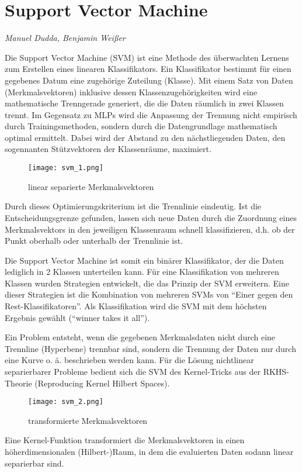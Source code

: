 \section{Support Vector Machine}
\textit{Manuel Dudda, Benjamin Weißer}

Die Support Vector Machine (SVM) ist eine Methode des überwachten Lernens zum Erstellen eines linearen Klassifikators. Ein Klassifikator bestimmt für einen gegebenes Datum eine zugehörige Zuteilung (Klasse). Mit einem Satz von Daten (Merkmalsvektoren) inklusive dessen Klassenzugehörigkeiten wird eine mathematische Trenngerade generiert, die die Daten räumlich in zwei Klassen trennt. Im Gegensatz zu MLPs wird die Anpassung der Trennung nicht empirisch durch Trainingsmethoden, sondern durch die Datengrundlage mathematisch optimal ermittelt. Dabei wird der Abstand zu den nächstliegenden Daten, den sogennanten Stützvektoren der Klassenräume, maximiert.

\begin{wrapfigure}{r}{0.4\textwidth}
	\vspace{-30pt}
	\begin{center}
		 \texttt{[image: svm\_1.png]}
	\end{center}
	\vspace{-15pt}
	\caption{linear separierte Merkmalsvektoren}
	\vspace{-15pt}
\end{wrapfigure}

Durch dieses Optimierungskriterium ist die Trennlinie eindeutig. Ist die Entscheidungsgrenze gefunden, lassen sich neue Daten durch die Zuordnung eines Merkmalsvektors in den jeweiligen Klassenraum schnell klassifizieren, d.h. ob der Punkt oberhalb oder unterhalb der Trennlinie ist.

Die Support Vector Machine ist somit ein binärer Klassifikator, der die Daten lediglich in 2 Klassen unterteilen kann. Für eine Klassifikation von mehreren Klassen wurden Strategien entwickelt, die das Prinzip der SVM erweitern. Eine dieser Strategien ist die Kombination von mehreren SVMs von “Einer gegen den Rest-Klassifikatoren”. Als Klassifikation wird die SVM mit dem höchsten Ergebnis gewählt (“winner takes it all”).

Ein Problem entsteht, wenn die gegebenen Merkmalsdaten nicht durch eine Trennline (Hyperbene) trennbar sind, sondern die Trennung der Daten nur durch eine Kurve o. ä. beschrieben werden kann. Für die Lösung nichtlinear separierbarer Probleme bedient sich die SVM des Kernel-Tricks aus der RKHS-Theorie (Reproducing Kernel Hilbert Spaces). 
\begin{wrapfigure}{l}{0.45\textwidth}
	\vspace{-30pt}
	\begin{center}
	    \texttt{[image: svm\_2.png]}
	\end{center}
	\vspace{-15pt}
	\caption{transformierte Merkmalsvektoren}
		\vspace{-65pt}
\end{wrapfigure}
Eine Kernel-Funktion transformiert die Merkmalsvektoren in einen höherdimensionalen (Hilbert-)Raum, in dem die evaluierten Daten sodann linear separierbar sind.


